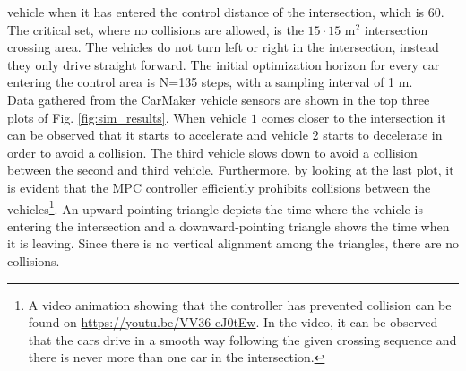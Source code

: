 \documentclass[letterpaper,10pt,conference]{ieeeconf}
\begin{document}
vehicle when it has entered the control distance of the intersection,
which is $60$. The critical set, where no collisions are allowed, is
the $15\cdot15$ m$^2$ intersection crossing area. The vehicles do not
turn left or right in the intersection, instead they only drive
straight forward. The initial optimization horizon for every car
entering the control area is N=135 steps, with a sampling interval of 1 m. \\ \indent
Data gathered from the CarMaker vehicle sensors are shown in the top three plots of Fig. \ref{fig:sim_results}. When vehicle $1$ comes closer to the intersection it can be observed that it starts to accelerate and vehicle $2$ starts to decelerate in order to avoid a collision. The third vehicle slows down to avoid a collision between the second and third vehicle.
Furthermore, by looking at the last plot, it is evident that the MPC controller efficiently prohibits collisions between the vehicles\footnote{A video animation showing that the controller has prevented collision can be found on \url{https://youtu.be/VV36-eJ0tEw}. In the video, it can be observed that the cars drive in a smooth way following the given crossing sequence and there is never more than one car in the intersection.}. An upward-pointing triangle depicts the time where the vehicle is entering the intersection and a downward-pointing triangle shows the time when it is leaving. Since there is no vertical alignment among the triangles, there are no collisions.
\end{document}
